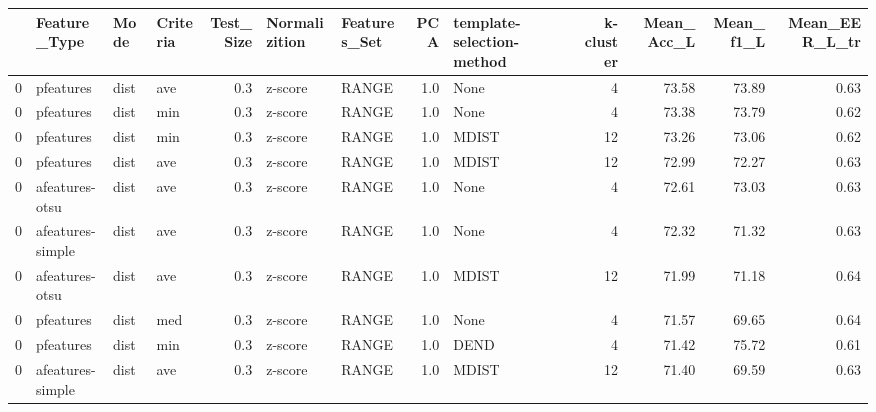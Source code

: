 \begin{tabular}{llllrllrlrrrr}
\toprule
{} &      Feature\_Type &  Mode & Criteria &  Test\_Size & Normalizition & Features\_Set &  PCA & template-selection-method &  k-cluster &  Mean\_Acc\_L &  Mean\_f1\_L &  Mean\_EER\_L\_tr \\
\midrule
0 &         pfeatures &  dist &      ave &        0.3 &       z-score &        RANGE &  1.0 &                      None &          4 &       73.58 &      73.89 &           0.63 \\
0 &         pfeatures &  dist &      min &        0.3 &       z-score &        RANGE &  1.0 &                      None &          4 &       73.38 &      73.79 &           0.62 \\
0 &         pfeatures &  dist &      min &        0.3 &       z-score &        RANGE &  1.0 &                     MDIST &         12 &       73.26 &      73.06 &           0.62 \\
0 &         pfeatures &  dist &      ave &        0.3 &       z-score &        RANGE &  1.0 &                     MDIST &         12 &       72.99 &      72.27 &           0.63 \\
0 &    afeatures-otsu &  dist &      ave &        0.3 &       z-score &        RANGE &  1.0 &                      None &          4 &       72.61 &      73.03 &           0.63 \\
0 &  afeatures-simple &  dist &      ave &        0.3 &       z-score &        RANGE &  1.0 &                      None &          4 &       72.32 &      71.32 &           0.63 \\
0 &    afeatures-otsu &  dist &      ave &        0.3 &       z-score &        RANGE &  1.0 &                     MDIST &         12 &       71.99 &      71.18 &           0.64 \\
0 &         pfeatures &  dist &      med &        0.3 &       z-score &        RANGE &  1.0 &                      None &          4 &       71.57 &      69.65 &           0.64 \\
0 &         pfeatures &  dist &      min &        0.3 &       z-score &        RANGE &  1.0 &                      DEND &          4 &       71.42 &      75.72 &           0.61 \\
0 &  afeatures-simple &  dist &      ave &        0.3 &       z-score &        RANGE &  1.0 &                     MDIST &         12 &       71.40 &      69.59 &           0.63 \\
\bottomrule
\end{tabular}
